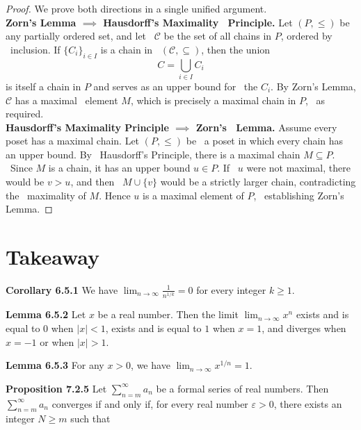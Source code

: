 \documentclass{article}
\begin{document}
\begin{proof}
    We prove both directions in a single unified argument.\\

    {\bf Zorn's Lemma $\implies$ Hausdorff's Maximality \
    Principle.}
    Let $(P,\le)$ be any partially ordered set, and let \
    $\mathcal{C}$ be the set of all chains in $P$, ordered by \
    inclusion.  If $\{C_i\}_{i\in I}$ is a chain in \
    $(\mathcal{C},\subseteq)$, then the union
    \[
        C=\bigcup_{i\in I}C_i
    \]
    is itself a chain in $P$ and serves as an upper bound for \
    the $C_i$.  By Zorn's Lemma, $\mathcal{C}$ has a maximal \
    element $M$, which is precisely a maximal chain in $P$, \
    as required.\\

    {\bf Hausdorff's Maximality Principle $\implies$ Zorn's \
    Lemma.}
    Assume every poset has a maximal chain.  Let $(P,\le)$ be \
    a poset in which every chain has an upper bound.  By \
    Hausdorff's Principle, there is a maximal chain $M\subseteq P$.  \
    Since $M$ is a chain, it has an upper bound $u\in P$.  If \
    $u$ were not maximal, there would be $v>u$, and then \
    $M\cup\{v\}$ would be a strictly larger chain, contradicting the \
    maximality of $M$.  Hence $u$ is a maximal element of $P$, \
    establishing Zorn's Lemma.
\end{proof}


\newpage


\section{Takeaway}
\textbf{Corollary 6.5.1} We have
\(\lim_{n \to \infty} \frac{1}{n^{1/k}} = 0\) for every integer \( k \geq 1\).

\medskip

\textbf{Lemma 6.5.2} Let $x$ be a real number. Then the limit
$\lim_{n \to \infty} x^n$ exists and is equal to $0$ when $|x| < 1$,
exists and is equal to $1$ when $x = 1$, and diverges when $x = -1$
or when $|x| > 1$.

\medskip

\textbf{Lemma 6.5.3} For any $x > 0$, we have
\(
\lim_{n \to \infty} x^{1/n} = 1.
\)

\medskip

\textbf{Proposition 7.2.5} Let $\sum_{n=m}^{\infty} a_n$ be a formal series of real numbers.
Then $\sum_{n=m}^{\infty} a_n$ converges if and only if, for every real number
$\varepsilon > 0$, there exists an integer $N \geq m$ such that
\end{document}
